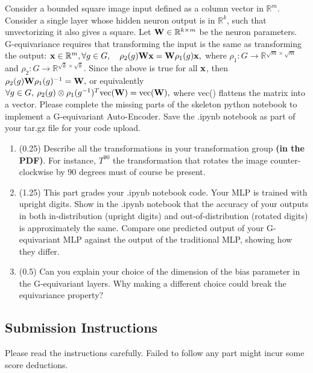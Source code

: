 \documentclass{article}
\begin{document}
Consider a bounded square image input defined as a column vector in $\mathbb{R}^m$.
Consider a single layer whose hidden neuron output is in $\mathbb{R}^k$, such that unvectorizing it also gives a square. Let ${\bf W} \in \mathbb{R}^{k \times m}$ be the neuron parameters. G-equivariance requires that transforming the input is the same as transforming the output: $
{\bf x} \in \mathbb{R}^m, \forall g \in G , \quad \rho_2(g) {\bf W} {\bf x} =  {\bf W} \rho_1(g) {\bf x},
$ where $\rho_1:G \to \mathbb{R}^{\sqrt{m} \times \sqrt{m}}$ and $\rho_2:G \to \mathbb{R}^{\sqrt{k} \times \sqrt{k}}$. Since the above is true for all ${\bf x}$, then  $\rho_2(g) {\bf W} \rho_1(g)^{-1} =  {\bf W},$ or equivalently  $\forall g \in G, \: \rho_2(g) \otimes \rho_1(g^{-1})^T \text{vec}({\bf W})  =  \text{vec}({\bf W}),$ where vec() flattens the matrix into a vector.
Please complete the missing parts of the skeleton python notebook to implement a G-equivariant Auto-Encoder. 
    Save the .ipynb notebook as part of your tar.gz file for your code upload. 

\begin{enumerate}
    \item (0.25)  Describe all the transformations in your transformation group {\bf (in the PDF)}. For instance, $T^{90}$ the transformation that rotates the image counter-clockwise by 90 degrees must of course be present.\\
    \vspace{2in}
    \item (1.25) This part grades your  .ipynb notebook code.
     Your MLP is trained with upright digits.  Show in the .ipynb notebook that the accuracy of your outputs in both in-distribution (upright digits) and out-of-distribution (rotated digits) is approximately the same.
     Compare one predicted output of your G-equivariant MLP against the output of the traditional MLP, showing how they differ.
    \vspace{3in}
        \item (0.5)  Can you explain your choice of the dimension of the bias parameter in the G-equivariant layers. Why making a different choice could break the equivariance property?
    
\end{enumerate}
\newpage
\subsection*{Submission Instructions}

Please read the instructions carefully. Failed to follow any part might incur some score deductions.
\end{document}

